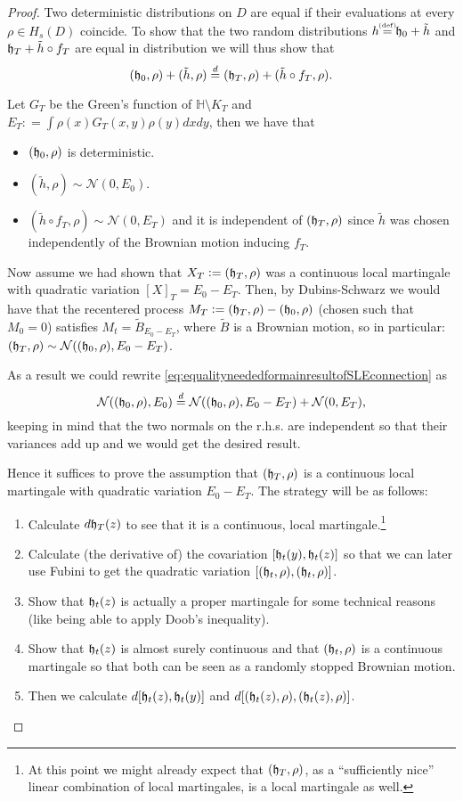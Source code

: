 \documentclass[11pt,reqno]{amsart}
\numberwithin{equation}{section}
\newcommand{\eqby}[1]{\mathrel{\stackrel{#1}{=}}}
\newcommand{\eqbydef}{\mathrel{\stackrel{\hspace*{-3mm}\text{\tiny(def)}\hspace*{-3mm}}{=}}}
\newcommand{\deq}{\mathrel{\mathop:}=}
\newcommand{\fh}{{\frak h}}
\begin{document}
\begin{proof}
	Two deterministic distributions on $D$ are equal if their evaluations at every $\rho\in H_s(D)$ coincide. To show that the two random distributions $h\eqbydef \fh_0+\tilde h$ and $\fh_T+\tilde h\circ f_T$ are equal in distribution we will thus show that \begin{equation}\label{eq:equalityneededformainresultofSLEconnection}
			(\fh_0,\rho)+(\tilde h,\rho)\eqby{d}(\fh_T,\rho)+(\tilde h\circ f_T,\rho).
		\end{equation}
	
	Let $G_T$ be the Green's function of $\mathbb H\setminus K_T$ and $E_T\deq\int \rho(x)G_T(x,y)\rho(y)dxdy$, then we have that
	\begin{itemize}
		\item $(\fh_0,\rho)$ is deterministic.
		\item $(\tilde h,\rho)\sim\mathcal N(0,E_0)$.
		\item $(\tilde h\circ f_T,\rho)\sim\mathcal N(0,E_T)$ and it is independent of $(\fh_T,\rho)$ since $\tilde h$ was chosen independently of the Brownian motion inducing $f_T$.
	\end{itemize}
	Now assume we had shown that $X_T\deq(\fh_T,\rho)$ was a continuous local martingale with quadratic variation $[X]_T=E_0-E_T$. Then, by Dubins-Schwarz we would have that the recentered process $M_T\deq(\fh_T,\rho)-(\fh_0,\rho)$ (chosen such that $M_0=0$) satisfies $M_t=\tilde B_{E_0-E_T}$, where $\tilde B$ is a Brownian motion, so in particular: $(\fh_T,\rho)\sim\mathcal N((\fh_0,\rho),E_0-E_T)$.
	
	As a result we could rewrite \eqref{eq:equalityneededformainresultofSLEconnection} as $$\mathcal N((\fh_0,\rho),E_0)\eqby{d}\mathcal N((\fh_0,\rho),E_0-E_T)+\mathcal N(0,E_T),$$
	keeping in mind that the two normals on the r.h.s. are independent so that their variances add up and we would get the desired result.
	
	Hence it suffices to prove the assumption that $(\fh_T,\rho)$ is a continuous local martingale with quadratic variation $E_0-E_T$. The strategy will be as follows:
	\begin{enumerate}
		\item Calculate $d\fh_T(z)$ to see that it is a continuous, local martingale.\footnote{At this point we might already expect that $(\fh_T,\rho)$, as a ``sufficiently nice'' linear combination of local martingales, is a local martingale as well.}
		\item Calculate (the derivative of) the covariation $[\fh_t(y),\fh_t(z)]$ so that we can later use Fubini to get the quadratic variation $[(\fh_t,\rho),(\fh_t,\rho)]$.
		\item Show that $\fh_t(z)$ is actually a proper martingale for some technical reasons (like being able to apply Doob's inequality).
		\item Show that $\fh_t(z)$ is almost surely continuous and that $(\fh_t,\rho)$ is a continuous martingale so that both can be seen as a randomly stopped Brownian motion.
		\item Then we calculate $d[\fh_t(z),\fh_t(y)]$ and $d[(\fh_t(z),\rho),(\fh_t(z),\rho)]$.
	\end{enumerate}
	

\end{proof}
\end{document}

